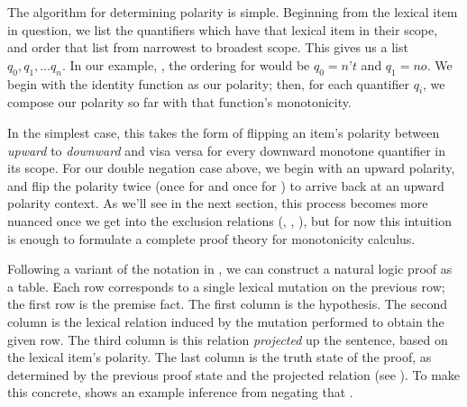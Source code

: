 The algorithm for determining polarity is simple.
Beginning from the lexical item in question, we list the quantifiers which have that lexical item
  in their scope, and order that list from narrowest to broadest scope.
This gives us a list $q_0, q_1, \dots q_n$.
In our example, , the ordering for  would be
  $q_0=\textit{n't}$ and $q_1=\textit{no}$.
We begin with the identity function as our polarity;
  then, for each quantifier $q_i$, we compose our polarity so far with
  that function's monotonicity.

In the simplest case, this takes the form of flipping an item's polarity between \textit{upward}
  to \textit{downward} and visa versa for every downward monotone quantifier in its scope.
For our double negation case above, we begin with an upward polarity, and flip the polarity twice
  (once for  and once for ) to arrive back at an upward polarity context.
As we'll see in the next section, this process becomes more nuanced once we get into the exclusion
  relations (\alternate, \negate, \cover), but for now this intuition is enough to formulate
  a complete proof theory for monotonicity calculus.

Following a variant of the notation in , we can 
  construct a natural logic proof as a table.
Each row corresponds to a single lexical mutation on the previous row; the first row is the
  premise fact.
The first column is the hypothesis.
The second column is the lexical relation induced by the mutation performed to obtain the given
  row.
The third column is this relation \textit{projected} up the sentence, based on the lexical item's
  polarity.
The last column is the truth state of the proof, as determined by the previous proof state and the
  projected relation (see ).
To make this concrete,  shows an example inference
  from  negating that .

